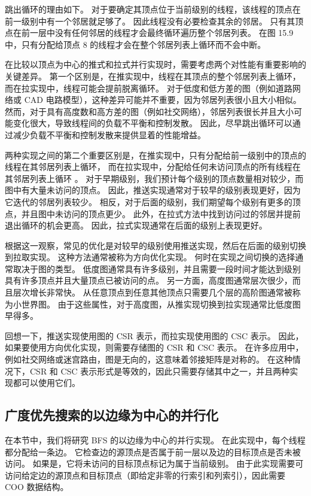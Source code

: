跳出循环的理由如下。 对于要确定其顶点位于当前级别的线程，该线程的顶点在前一级别中有一个邻居就足够了。 
因此线程没有必要检查其余的邻居。 只有其顶点在前一层中没有任何邻居的线程才会最终循环遍历整个邻居列表。 
在图 15.9 中，只有分配给顶点 8 的线程才会在整个邻居列表上循环而不会中断。

在比较以顶点为中心的推式和拉式并行实现时，需要考虑两个对性能有重要影响的关键差异。 
第一个区别是，在推实现中，线程在其顶点的整个邻居列表上循环，而在拉实现中，线程可能会提前脱离循环。 
对于低度和低方差的图（例如道路网络或 CAD 电路模型），这种差异可能并不重要，因为邻居列表很小且大小相似。 
然而，对于具有高度数和高方差的图（例如社交网络），邻居列表很长并且大小可能变化很大，导致线程间的负载不平衡和控制发散。 
因此，尽早跳出循环可以通过减少负载不平衡和控制发散来提供显着的性能增益。

两种实现之间的第二个重要区别是，在推实现中，只有分配给前一级别中的顶点的线程在其邻居列表上循环，
而在拉实现中，分配给任何未访问顶点的所有线程在其邻居列表上循环 。 
对于早期级别，我们预计每个级别的顶点数量相对较少，而图中有大量未访问的顶点。 
因此，推送实现通常对于较早的级别表现更好，因为它迭代的邻居列表较少。 
相反，对于后面的级别，我们期望每个级别有更多的顶点，并且图中未访问的顶点更少。 
此外，在拉式方法中找到访问过的邻居并提前退出循环的机会更高。 因此，拉式实现通常在后面的级别上表现更好。

根据这一观察，常见的优化是对较早的级别使用推送实现，然后在后面的级别切换到拉取实现。 这种方法通常被称为方向优化实现。 
何时在实现之间切换的选择通常取决于图的类型。 
低度图通常具有许多级别，并且需要一段时间才能达到级别具有许多顶点并且大量顶点已被访问的点。 
另一方面，高度图通常层次很少，而且层次增长非常快。 从任意顶点到任意其他顶点只需要几个层的高阶图通常被称为小世界图。 
由于这些属性，对于高度图，从推实现切换到拉实现通常比低度图早得多。

回想一下，推送实现使用图的 CSR 表示，而拉实现使用图的 CSC 表示。 
因此，如果要使用方向优化实现，则需要存储图的 CSR 和 CSC 表示。 
在许多应用中，例如社交网络或迷宫路由，图是无向的，这意味着邻接矩阵是对称的。 
在这种情况下，CSR 和 CSC 表示形式是等效的，因此只需要存储其中之一，并且两种实现都可以使用它们。

\subsection{广度优先搜索的以边缘为中心的并行化}
在本节中，我们将研究 BFS 的以边缘为中心的并行实现。 
在此实现中，每个线程都分配给一条边。 它检查边的源顶点是否属于前一层以及边的目标顶点是否未被访问。 
如果是，它将未访问的目标顶点标记为属于当前级别。 
由于此实现需要可访问给定边的源顶点和目标顶点（即给定非零的行索引和列索引），因此需要 COO 数据结构。

